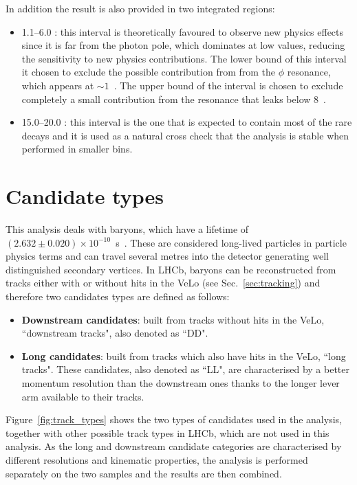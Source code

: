 In addition the result is also provided in two integrated regions:
\begin{itemize}
\item 1.1--6.0 \gevgevcccc: this interval is theoretically favoured to observe new physics effects since 
it is far from the photon pole, which dominates at low \qsq values, reducing the sensitivity to new physics contributions.
The lower bound of this interval it chosen to exclude the possible contribution from
from the $\phi$ resonance, which appears at $\sim1$~\gevgevcccc. The upper bound of the interval
is chosen to exclude completely a small contribution from the \jpsi resonance that leaks
below 8~\gevgevcccc.
\item 15.0--20.0 \gevgevcccc: this interval is the one that is expected to contain most of the
rare decays and it is used as a natural cross check that the analysis is stable when performed in smaller bins.
\end{itemize}

\section{Candidate types}

This analysis deals with \Lz baryons, which have a lifetime of \mbox{$(2.632 \pm 0.020 ) \times 10^{-10}$ s~\cite{PDG2014}}.
These are considered long-lived particles in particle physics terms and can travel several metres into the
detector generating well distinguished secondary vertices.
In LHCb, \Lz baryons can be reconstructed from tracks either with or without hits in the VeLo (see Sec.~\ref{sec:tracking}) and
therefore two candidates types are defined as follows:

\begin{itemize}
\item {\bf Downstream candidates}: built from tracks without hits in the VeLo, 
``downstream tracks", also denoted as ``DD".
\item {\bf Long candidates}: built from tracks which also have hits in the VeLo, ``long tracks".
These candidates, also denoted as ``LL", are characterised by a better momentum resolution
than the downstream ones thanks to the longer lever arm available to their tracks.
\end{itemize}

Figure~\ref{fig:track_types} shows the two types of candidates used in the analysis,
together with other possible track types in LHCb, which are not used in this analysis.
As the long and downstream candidate categories are characterised by different resolutions and 
kinematic properties, the analysis is performed separately on the two samples and the results are then combined.

